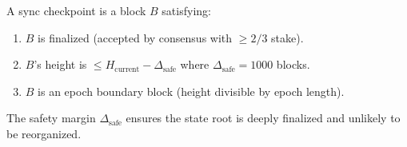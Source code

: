 \begin{definition}
A sync checkpoint is a block $B$ satisfying:
\begin{enumerate}
    \item $B$ is finalized (accepted by consensus with $\geq 2/3$ stake).
    \item $B$'s height is $\leq H_{\text{current}} - \Delta_{\text{safe}}$ where $\Delta_{\text{safe}} = 1000$ blocks.
    \item $B$ is an epoch boundary block (height divisible by epoch length).
\end{enumerate}
\end{definition}

The safety margin $\Delta_{\text{safe}}$ ensures the state root is deeply finalized and unlikely to be reorganized.

